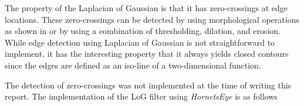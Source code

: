 \documentclass[a4paper,12pt]{book}
\begin{document}
The property of the Laplacian of Gaussian is that it has zero-crossings
at edge locations. These zero-crossings can be detected by using morphological
operations as shown in \cite{RefWorks:356} or by using a combination of
thresholding, dilation, and erosion.
While edge detection using Laplacian of Gaussian is not straightforward
to implement, it has the interesting property that it always yields closed
contours since the edges are defined as an iso-line of a two-dimensional
function.

The detection of zero-crossings was not implemented at the time of writing
this report. The implementation of the LoG filter using \emph{HornetsEye} is
as follows
\begin{scriptsize}
  
\end{scriptsize}





\end{document}
